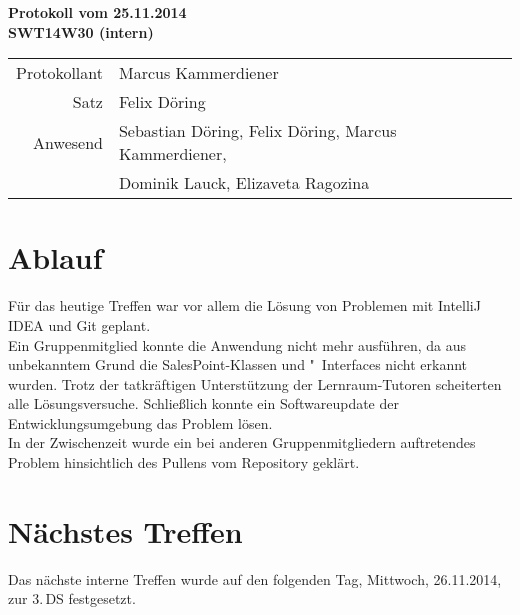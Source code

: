 \documentclass{scrartcl}
\begin{document}
\begin{center}
\LARGE \bf{Protokoll vom 25.11.2014 \\
SWT14W30 (intern)}
\end{center}

\begin{tabular}{rp{10cm}}
Protokollant & Marcus Kammerdiener \\
Satz & Felix Döring \\
Anwesend & Sebastian Döring, Felix Döring, Marcus Kammerdiener,\\
& Dominik Lauck, Elizaveta Ragozina \\
\end{tabular}

\vspace*{3em}

\section{Ablauf}
Für das heutige Treffen war vor allem die Lösung von Problemen mit IntelliJ IDEA und Git geplant. \\
Ein Gruppenmitglied konnte die Anwendung nicht mehr ausführen, da aus unbekanntem Grund die SalesPoint-Klassen und "~Interfaces nicht erkannt wurden.
Trotz der tatkräftigen Unterstützung der Lernraum-Tutoren scheiterten alle Lösungsversuche.
Schließlich konnte ein Softwareupdate der Entwicklungsumgebung das Problem lösen. \\
In der Zwischenzeit wurde ein bei anderen Gruppenmitgliedern auftretendes Problem hinsichtlich des Pullens vom Repository geklärt.

\vspace*{1em}

\section{N\"achstes Treffen}
Das nächste interne Treffen wurde auf den folgenden Tag, Mittwoch, 26.11.2014, zur 3.\,DS festgesetzt.
\end{document}
